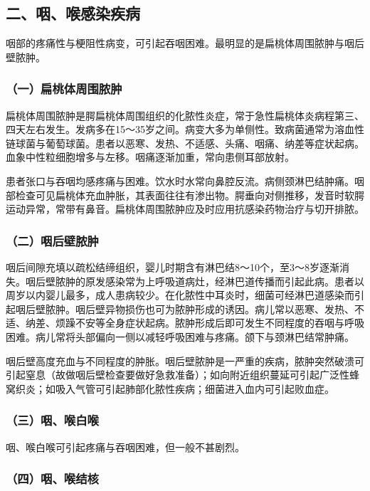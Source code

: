 \subsection{二、咽、喉感染疾病}

咽部的疼痛性与梗阻性病变，可引起吞咽困难。最明显的是扁桃体周围脓肿与咽后壁脓肿。

\subsubsection{（一）扁桃体周围脓肿}

扁桃体周围脓肿是腭扁桃体周围组织的化脓性炎症，常于急性扁桃体炎病程第三、四天左右发生。发病多在15～35岁之间。病变大多为单侧性。致病菌通常为溶血性链球菌与葡萄球菌。患者以恶寒、发热、不适感、头痛、咽痛、纳差等症状起病。血象中性粒细胞增多与左移。咽痛逐渐加重，常向患侧耳部放射。

患者张口与吞咽均感疼痛与困难。饮水时水常向鼻腔反流。病侧颈淋巴结肿痛。咽部检查可见扁桃体充血肿胀，其表面往往有渗出物。腭垂向对侧推移，发音时软腭运动异常，常带有鼻音。扁桃体周围脓肿应及时应用抗感染药物治疗与切开排脓。

\subsubsection{（二）咽后壁脓肿}

咽后间隙充填以疏松结缔组织，婴儿时期含有淋巴结8～10个，至3～8岁逐渐消失。咽后壁脓肿的原发感染常为上呼吸道病灶，经淋巴道传播而引起此病。患者以周岁以内婴儿最多，成人患病较少。在化脓性中耳炎时，细菌可经淋巴道感染而引起咽后壁脓肿。咽后壁异物损伤也可为脓肿形成的诱因。病儿常以恶寒、发热、不适、纳差、烦躁不安等全身症状起病。脓肿形成后即可发生不同程度的吞咽与呼吸困难。病儿常将头部偏向一侧以减轻呼吸困难与疼痛。颌下与颈淋巴结常肿痛。

咽后壁高度充血与不同程度的肿胀。咽后壁脓肿是一严重的疾病，脓肿突然破溃可引起窒息（故做咽后壁检查要做好急救准备）；如向附近组织蔓延可引起广泛性蜂窝织炎；如吸入气管可引起肺部化脓性疾病；细菌进入血内可引起败血症。

\subsubsection{（三）咽、喉白喉}

咽、喉白喉可引起疼痛与吞咽困难，但一般不甚剧烈。

\subsubsection{（四）咽、喉结核}

